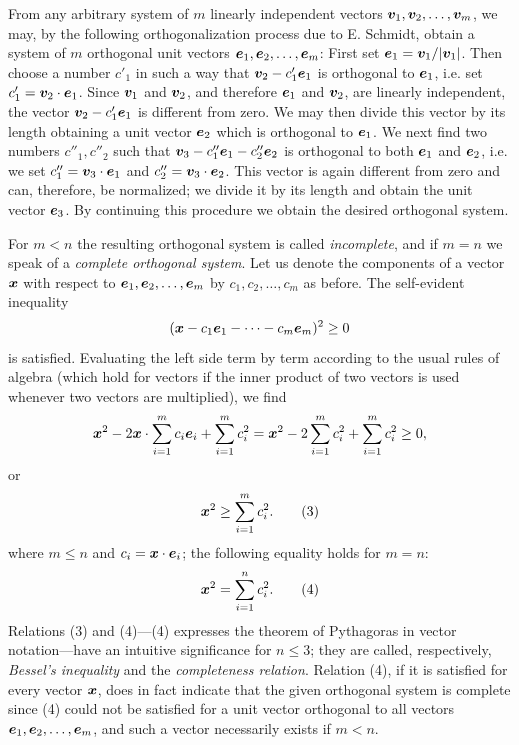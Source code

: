 From any arbitrary system of $m$ linearly independent vectors $\bm{v}_1,\bm{v}_2,\ldots,\bm{v}_m$, we may, by the following orthogonalization process due to E. Schmidt, obtain a system of $m$ orthogonal unit vectors $\bm{e}_1,\bm{e}_2,\ldots,\bm{e}_m$: First set $\bm{e}_1=\bm{v}_1/|\bm{v}_1|$. Then choose a number $c'_1$ in such a way that $\bm{v}_2-c'_1\bm{e}_1$ is orthogonal to $\bm{e}_1$, i.e. set $c'_1=\bm{v}_2\cdot\bm{e}_1$. Since $\bm{v}_1$ and $\bm{v}_2$, and therefore $\bm{e}_1$ and $\bm{v}_2$, are linearly independent, the vector $\bm{v}_2-c'_1\bm{e}_1$ is different from zero. We may then divide this vector by its length obtaining a unit vector $\bm{e}_2$ which is orthogonal to $\bm{e}_1$. We next find two numbers $c''_1,c''_2$ such that $\bm{v}_3-c''_1\bm{e}_1-c''_2\bm{e}_2$ is orthogonal to both $\bm{e}_1$ and $\bm{e}_2$, i.e. we set $c''_1=\bm{v}_3\cdot\bm{e}_1$ and $c''_2=\bm{v}_3\cdot\bm{e}_2$. This vector is again different from zero and can, therefore, be normalized; we divide it by its length and obtain the unit vector $\bm{e}_3$. By continuing this procedure we obtain the desired orthogonal system.

For $m<n$ the resulting orthogonal system is called \emph{incomplete}, and if $m=n$ we speak of a \emph{complete orthogonal system}. Let us denote the components of a vector $\bm{x}$ with respect to $\bm{e}_1,\bm{e}_2,\ldots,\bm{e}_m$ by $c_1,c_2,\ldots,c_m$ as before. The self-evident inequality
\[
(\bm{x}-c_1\bm{e}_1-\cdots-c_m\bm{e}_m)^2\ge0
\]
is satisfied. Evaluating the left side term by term according to the usual rules of algebra (which hold for vectors if the inner product of two vectors is used whenever two vectors are multiplied), we find
\[
\bm{x}^2-2\bm{x}\cdot\sum_{i=1}^{m}c_i\bm{e}_i+\sum_{i=1}^{m}c_i^2
=\bm{x}^2-2\sum_{i=1}^{m}c_i^2+\sum_{i=1}^{m}c_i^2\ge0,
\]
or
\begin{equation*}
\bm{x}^{2}\ge\sum_{i=1}^{m}c_i^2.
\tag{3}
\end{equation*}
where $m\le n$ and $c_i=\bm{x}\cdot\bm{e}_i$; the following equality holds for $m=n$:
\begin{equation*}
\bm{x}^{2}=\sum_{i=1}^{n}c_i^2.
\tag{4}
\end{equation*}
Relations (3) and (4)---(4) expresses the theorem of Pythagoras in vector notation---have an intuitive significance for $n\le3$; they are called, respectively, \emph{Bessel's inequality} and the \emph{completeness relation}. Relation (4), if it is satisfied for every vector $\bm{x}$, does in fact indicate that the given orthogonal system is complete since (4) could not be satisfied for a unit vector orthogonal to all vectors $\bm{e}_1,\bm{e}_2,\ldots,\bm{e}_m$, and such a vector necessarily exists if $m<n$.

